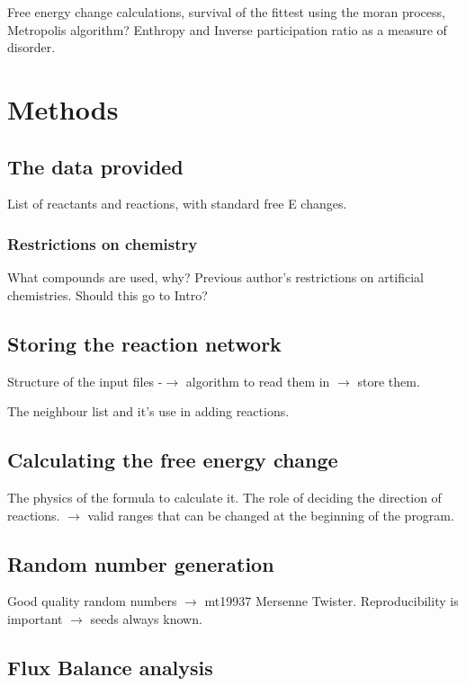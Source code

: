 \documentclass[]{article}
\begin{document}
Free energy change calculations, survival of the fittest using the moran process, Metropolis algorithm? Enthropy and Inverse participation ratio as a measure of disorder. 


\section{Methods}
\label{sec:methods}

\subsection{The data provided}
\label{sub:What was I provided with?}
List of reactants and reactions, with standard free E changes. 
\subsubsection{Restrictions on chemistry}
\label{ssub:Restrictions on chemistry}
What compounds are used, why?
Previous author's restrictions on artificial chemistries. Should this go to Intro?
\subsection{Storing the reaction network}
\label{sub:Storing the reaction network}
Structure of the input files -$\rightarrow$ algorithm to read them in $\rightarrow$ store them. 

The neighbour list and it's use in adding reactions.
\subsection{Calculating the free energy change}
\label{sub:The free energy change}
The physics of the formula to calculate it. The role of deciding the direction of reactions.  $\rightarrow$ valid ranges  that can be changed at the beginning of the program.

\subsection{Random number generation}
\label{sub:Random number generation}

Good quality random numbers $\rightarrow$ mt19937 Mersenne Twister. Reproducibility is important $\rightarrow$ seeds always known. 



\subsection{Flux Balance analysis}
\label{sub:Flux Balance analysis}
\end{document}
